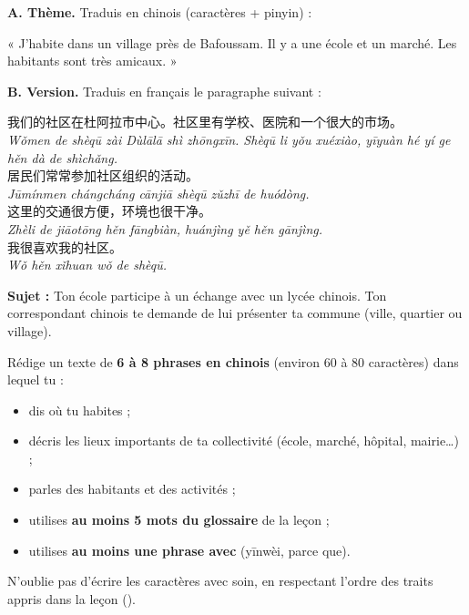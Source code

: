 \documentclass[11pt]{article}
\newcommand{\zh}[1]{\ifmmode\text{#1}\else{#1}\fi}
\begin{document}
\begin{exercice}
\textbf{A. Thème.} Traduis en chinois (caractères + pinyin) :

« J'habite dans un village près de Bafoussam. Il y a une école et un marché. Les habitants sont très amicaux. »

\textbf{B. Version.} Traduis en français le paragraphe suivant :

\begin{textebox}[我们的社区]
我们的社区在杜阿拉市中心。社区里有学校、医院和一个很大的市场。\\
\emph{Wǒmen de shèqū zài Dùlālā shì zhōngxīn. Shèqū li yǒu xuéxiào, yīyuàn hé yí ge hěn dà de shìchǎng.}\\
居民们常常参加社区组织的活动。\\
\emph{Jūmínmen chángcháng cānjiā shèqū zǔzhī de huódòng.}\\
这里的交通很方便，环境也很干净。\\
\emph{Zhèli de jiāotōng hěn fāngbiàn, huánjìng yě hěn gānjìng.}\\
我很喜欢我的社区。\\
\emph{Wǒ hěn xǐhuan wǒ de shèqū.}
\end{textebox}
\end{exercice}

\begin{exercice}
\textbf{Sujet :} Ton école participe à un échange avec un lycée chinois. Ton correspondant chinois te demande de lui présenter ta commune (ville, quartier ou village).

Rédige un texte de \textbf{6 à 8 phrases en chinois} (environ 60 à 80 caractères) dans lequel tu :
\begin{itemize}
\item dis où tu habites ;
\item décris les lieux importants de ta collectivité (école, marché, hôpital, mairie\ldots) ;
\item parles des habitants et des activités ;
\item utilises \textbf{au moins 5 mots du glossaire} de la leçon ;
\item utilises \textbf{au moins une phrase avec} \zh{因为} (yīnwèi, parce que).
\end{itemize}

N'oublie pas d'écrire les caractères avec soin, en respectant l'ordre des traits appris dans la leçon (\zh{城、区、村、民、住}).
\end{exercice}
\end{document}
